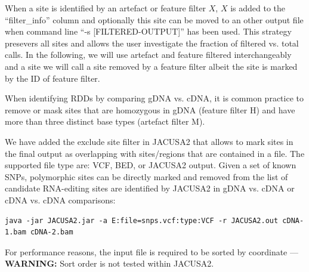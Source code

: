 \documentclass[10pt,a4paper]{article} \usepackage[utf8]{inputenc}
\begin{document}
When a site is identified by an artefact or feature filter $X$, $X$ is added to the ``filter\_info'' column 
and optionally this site can be moved to an other output file when command line ``-s [FILTERED-OUTPUT]'' has been used.
This strategy presevers all sites and allows the user investigate the fraction of filtered vs. total calls. 
In the following, we will use artefact and feature filtered interchangeably and a site we will call a site removed 
by a feature filter albeit the site is marked by the ID of feature filter.

When identifying RDDs by comparing gDNA vs. cDNA, it is common practice to remove or mask sites that 
are homozygous in gDNA (feature filter H) and have more than three distinct base types (artefact filter M).

We have added the exclude site filter in JACUSA2 that allows to mark sites in the final output as 
overlapping with sites/regions that are contained in a file. The supported file type are: VCF, BED, or JACUSA2 output. 
Given a set of known SNPs, polymorphic sites can be directly marked and removed from the list of 
candidate RNA-editing sites are identified by JACUSA2 in gDNA vs. cDNA or cDNA vs. cDNA comparisons:
\begin{verbatim}
java -jar JACUSA2.jar -a E:file=snps.vcf:type:VCF -r JACUSA2.out cDNA-1.bam cDNA-2.bam
\end{verbatim}
For performance reasons, the input file is required to be sorted by coordinate --- \textbf{WARNING:} 
Sort order is not tested within JACUSA2.
\end{document}
